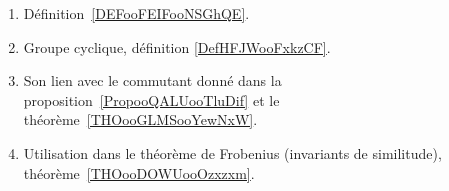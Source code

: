 
\begin{enumerate}
	\item
	      Définition~\ref{DEFooFEIFooNSGhQE}.
	\item
	      Groupe cyclique, définition \ref{DefHFJWooFxkzCF}.
	\item
	      Son lien avec le commutant donné dans la proposition~\ref{PropooQALUooTluDif} et le théorème~\ref{THOooGLMSooYewNxW}.
	\item
	      Utilisation dans le théorème de Frobenius (invariants de similitude), théorème~\ref{THOooDOWUooOzxzxm}.
\end{enumerate}
